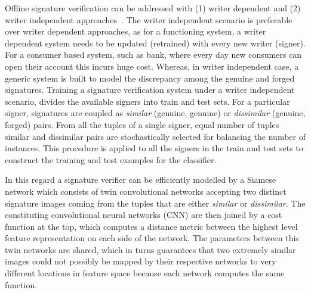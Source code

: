 \documentclass[times,twocolumn,final]{elsarticle}
\begin{document}
Offline signature verification can be addressed with (1) writer dependent and (2) writer independent approaches~\cite{Bertolini2010}. The writer independent scenario is preferable over writer dependent approaches, as for a functioning system, a writer dependent system needs to be updated (retrained) with every new writer (signer). For a consumer based system, such as bank,  where every day new consumers can open their account this incurs huge cost. Whereas, in writer independent case, a generic system is built to model the discrepancy among the genuine and forged signatures. Training a signature verification system under a writer independent scenario, divides the available signers into train and test sets. For a particular signer, signatures are coupled as \emph{similar} (genuine, genuine) or \emph{dissimilar} (genuine, forged) pairs. From all the tuples of a single signer, equal number of tuples similar and dissimilar pairs are stochastically selected for balancing the number of instances. This procedure is applied to all the signers in the train and test sets to construct the training and test examples for the classifier.

In this regard a signature verifier can be efficiently modelled by a Siamese network which consists of twin convolutional networks accepting two distinct signature images coming from the tuples that are either \emph{similar} or \emph{dissimilar}. The constituting convolutional neural networks (CNN) are then joined by a cost function at the top, which computes a distance metric between the highest level feature representation on each side of the network. The parameters between this twin networks are shared, which in turns guarantees that two extremely similar images could not possibly be mapped by their respective networks to very different locations in feature space because each network computes the same function.
\end{document}
